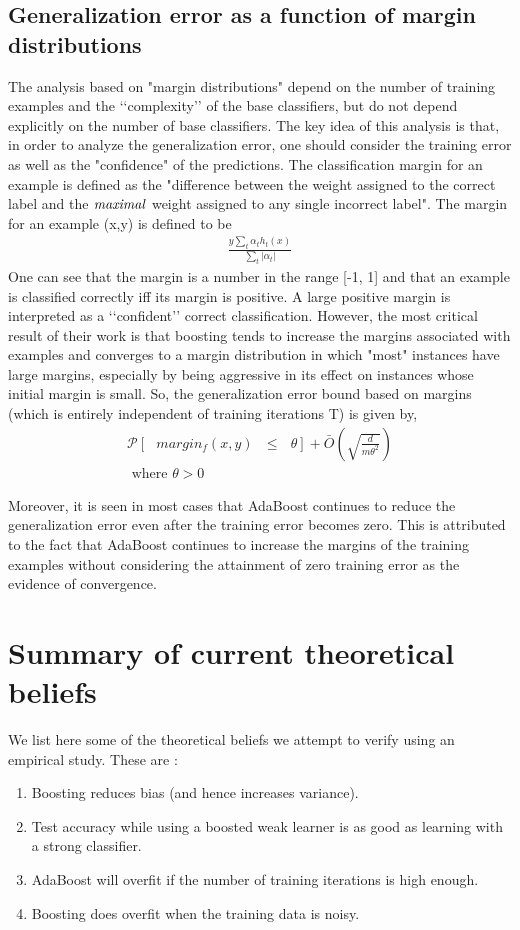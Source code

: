 \documentclass[letterpaper,11pt]{article}
\begin{document}
\subsection {Generalization error as a function of margin distributions}
The analysis based on "margin distributions" \cite{sfbl98} depend on the number of training examples and the ‘‘complexity’’ of the base classifiers, but do not depend explicitly on the number of base classifiers. The key idea of this analysis is that, in order to analyze the generalization error, one should consider the training error as well as the "confidence" of the predictions. The classification margin for an example is defined as the "difference between the weight assigned to the correct label and the $\it maximal $ weight assigned to any single incorrect label". The margin for an example (x,y) is defined to be
\begin{align}
\frac{y \sum_t \alpha_t h_t(x)}{\sum_t| \alpha_t|}
\end{align}
One can see that the margin is a number in the range [-1, 1] and that an example is classified correctly iff its margin is positive. A large positive margin is interpreted as a ‘‘confident’’ correct classification. However, the most critical result of their work is that boosting tends to increase the margins associated with examples and converges to a margin distribution in which "most" instances have large margins, especially by being aggressive in its effect on instances whose initial margin is small. So, the generalization error bound based on margins (which is entirely independent of training iterations T) is given by,
\begin{align}
\mathcal P [\text{  }margin_f(x,y) \text{  } \le \text{  } \theta] + \bar O(\sqrt{\frac{d}{m\theta^2}}) \nonumber \\
\text{ where } \theta > 0 \nonumber
\end{align}

Moreover, it is seen in most cases that AdaBoost  continues to reduce the generalization error even after the training error becomes zero. This is attributed to the fact that AdaBoost continues to increase the margins of the training examples without considering the attainment of zero training error as the evidence of convergence.

\section {Summary of current theoretical beliefs}
We list here some of the theoretical beliefs we attempt to verify using an empirical study. These are : 
\begin{enumerate}
\item Boosting reduces bias (and hence increases variance). \cite{bmw07}
\item Test accuracy while using a boosted weak learner is as good as learning with a strong classifier. \cite{s90}
\item AdaBoost will overfit if the number of training iterations is high enough. \cite{bmw07, BL98}
\item Boosting does overfit when the training data is noisy. \cite{klw01}
\end{enumerate}
\end{document}

